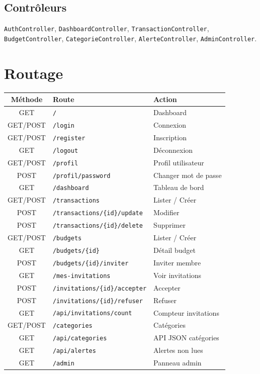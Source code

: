 \documentclass[12pt,a4paper,twoside]{report}
\begin{document}
\subsection{Contrôleurs}
\texttt{AuthController}, \texttt{DashboardController}, \texttt{TransactionController}, \texttt{BudgetController}, \texttt{CategorieController}, \texttt{AlerteController}, \texttt{AdminController}.

\section{Routage}

\begin{longtable}{cll}
  \toprule
  \textbf{Méthode} & \textbf{Route} & \textbf{Action} \\
  \midrule\endhead
  \bottomrule\endfoot
  GET & \texttt{/} & Dashboard \\
  GET/POST & \texttt{/login} & Connexion \\
  GET/POST & \texttt{/register} & Inscription \\
  GET & \texttt{/logout} & Déconnexion \\
  GET/POST & \texttt{/profil} & Profil utilisateur \\
  POST & \texttt{/profil/password} & Changer mot de passe \\
  GET & \texttt{/dashboard} & Tableau de bord \\
  GET/POST & \texttt{/transactions} & Lister / Créer \\
  POST & \texttt{/transactions/\{id\}/update} & Modifier \\
  POST & \texttt{/transactions/\{id\}/delete} & Supprimer \\
  GET/POST & \texttt{/budgets} & Lister / Créer \\
  GET & \texttt{/budgets/\{id\}} & Détail budget \\
  POST & \texttt{/budgets/\{id\}/inviter} & Inviter membre \\
  GET & \texttt{/mes-invitations} & Voir invitations \\
  POST & \texttt{/invitations/\{id\}/accepter} & Accepter \\
  POST & \texttt{/invitations/\{id\}/refuser} & Refuser \\
  GET & \texttt{/api/invitations/count} & Compteur invitations \\
  GET/POST & \texttt{/categories} & Catégories \\
  GET & \texttt{/api/categories} & API JSON catégories \\
  GET & \texttt{/api/alertes} & Alertes non lues \\
  GET & \texttt{/admin} & Panneau admin \\
\end{longtable}
\end{document}
